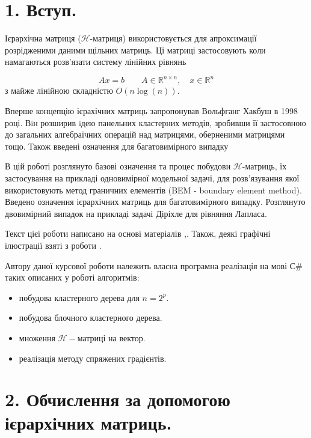 \documentclass[12pt]{report}
\begin{document}
\chapter{1. Вступ.}
	\hspace{0.8cm} Ієрархічна матриця ($\mathcal{H}$-матриця) використовується для апроксимації розрідженими даними щільних матриць. Ці матриці застосовують коли намагаються розв'язати систему лінійних рівнянь
	
	 $$ Ax=b \quad\quad  A \in \mathbb{R}^{n\times n} ,\quad   x\in \mathbb{R}^n$$ \newline
	 з майже лінійною складністю $O(n\log(n))$.
	 \par Вперше концепцію ієрахічних матриць запропонував Вольфганг Хакбуш  в 1998 році. Вiн розширив iдею панельних кластерних методів, зробивши її застосовною до загальних алгебраїчних операцій над матрицями, оберненими матрицями тощо. Також введені означення для багатовимірного випадку 
	 \par В цій роботі розглянуто базові означення та процес побудови $\mathcal{H}$-матриць, їх застосування на прикладі одновимірної модельної задачі, для розв'язування якої використовують метод граничних елементів (BEM - boundary element method). Введено означення ієрархічних матриць для  багатовимірного випадку. Розглянуто двовимірний випадок на прикладі задачі Діріхле для рівняння Лапласа.
	 \par Текст цієї роботи написано на основі матеріалів \cite{HM},\cite{Diss}. Також, деякі графічні ілюстрації взяті з роботи \cite{HM}.
	 \par Автору даної курсової роботи належить власна програмна реалізація на мові С$\#$ таких описаних у роботі алгоритмів:
	 \begin{itemize}
	 	\item побудова кластерного дерева для $n=2^p$.
	 	\item побудова блочного кластерного дерева.
	 	\item множення $\mathcal{H}-$матриці на вектор.
	 	\item реалізація методу спряжених градієнтів.
	 \end{itemize} 
	
\newpage
\chapter{2. Обчислення за допомогою ієрархічних матриць.}
\end{document}
